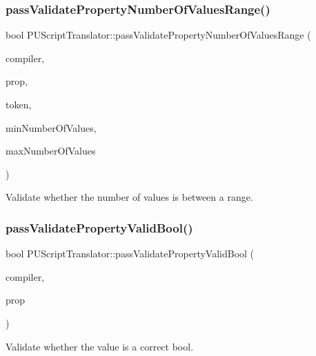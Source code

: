 \subsubsection{\texorpdfstring{pass\+Validate\+Property\+Number\+Of\+Values\+Range()}{passValidatePropertyNumberOfValuesRange()}\hspace{0.1cm}{\footnotesize\ttfamily [2/2]}}
{\footnotesize\ttfamily bool P\+U\+Script\+Translator\+::pass\+Validate\+Property\+Number\+Of\+Values\+Range (\begin{DoxyParamCaption}\item[{\hyperlink{classPUScriptCompiler}{P\+U\+Script\+Compiler} $\ast$}]{compiler,  }\item[{\hyperlink{classPUPropertyAbstractNode}{P\+U\+Property\+Abstract\+Node} $\ast$}]{prop,  }\item[{const std\+::string \&}]{token,  }\item[{unsigned short}]{min\+Number\+Of\+Values,  }\item[{unsigned short}]{max\+Number\+Of\+Values }\end{DoxyParamCaption})}

Validate whether the number of values is between a range. \mbox{\label{classPUScriptTranslator_ac14e053124729ee15b9eb6ecddce28ac}} 
\subsubsection{\texorpdfstring{pass\+Validate\+Property\+Valid\+Bool()}{passValidatePropertyValidBool()}\hspace{0.1cm}{\footnotesize\ttfamily [1/2]}}
{\footnotesize\ttfamily bool P\+U\+Script\+Translator\+::pass\+Validate\+Property\+Valid\+Bool (\begin{DoxyParamCaption}\item[{\hyperlink{classPUScriptCompiler}{P\+U\+Script\+Compiler} $\ast$}]{compiler,  }\item[{\hyperlink{classPUPropertyAbstractNode}{P\+U\+Property\+Abstract\+Node} $\ast$}]{prop }\end{DoxyParamCaption})}

Validate whether the value is a correct bool. \mbox{\label{classPUScriptTranslator_ac14e053124729ee15b9eb6ecddce28ac}} 
